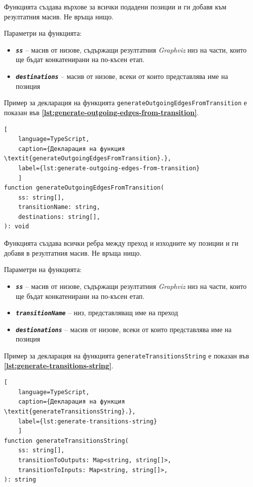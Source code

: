 Функцията създава върхове за всички подадени позиции и ги добавя към резултатния масив. Не връща нищо.

Параметри на функцията:

\vspace{-0.3cm}

\begin{itemize}
	\item \texttt{\textbf{\textit{ss}}} -- масив от низове, съдържащи резултатния \textit{Graphviz} низ на части, които ще бъдат конкатенирани на по-късен етап.
	\item \texttt{\textbf{\textit{destinations}}} -- масив от низове, всеки от които представлява име на позиция
\end{itemize}

\vspace{0.55cm}

Пример за декларация на функцията \texttt{generateOutgoingEdgesFromTransition} е показан във \textbf{\autoref{lst:generate-outgoing-edges-from-transition}}.
\begin{lstlisting}[
	language=TypeScript,
	caption={Декларация на функция \textit{generateOutgoingEdgesFromTransition}.},
	label={lst:generate-outgoing-edges-from-transition}
	]
function generateOutgoingEdgesFromTransition(
    ss: string[],
    transitionName: string,
    destinations: string[],
): void
\end{lstlisting}

Функцията създава всички ребра между преход и изходните му позиции и ги добавя в резултатния масив. Не връща нищо.

Параметри на функцията:

\vspace{-0.3cm}

\begin{itemize}
	\item \texttt{\textbf{\textit{ss}}} -- масив от низове, съдържащи резултатния \textit{Graphviz} низ на части, които ще бъдат конкатенирани на по-късен етап.
	\item \texttt{\textbf{\textit{transitionName}}} -- низ, представляващ име на преход
	\item \texttt{\textbf{\textit{destionations}}} -- масив от низове, всеки от които представлява име на позиция
\end{itemize}

\vspace{0.55cm}

Пример за декларация на функцията \texttt{generateTransitionsString} е показан във \textbf{\autoref{lst:generate-transitions-string}}.
\begin{lstlisting}[
	language=TypeScript,
	caption={Декларация на функция \textit{generateTransitionsString}.},
	label={lst:generate-transitions-string}
	]
function generateTransitionsString(
    ss: string[],
    transitionToOutputs: Map<string, string[]>,
    transitionToInputs: Map<string, string[]>,
): string
\end{lstlisting}

